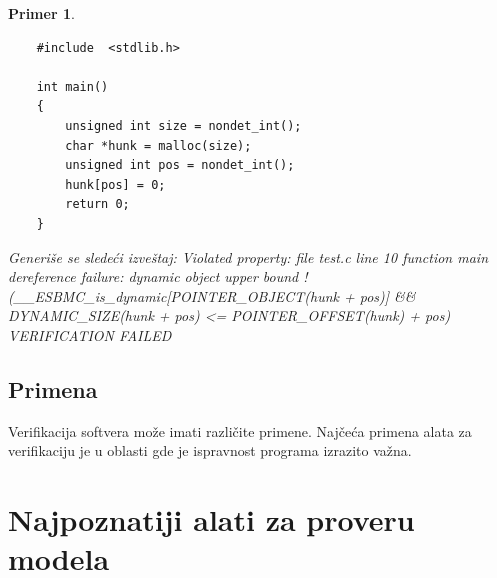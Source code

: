 \documentclass[a4paper]{article}
\newtheorem{primer}{Primer}[section]
\begin{document}
{\begin{primer}
\begin{verbatim}
	#include  <stdlib.h>  	
	
	int main()
	{
		unsigned int size = nondet_int();
		char *hunk = malloc(size); 
		unsigned int pos = nondet_int(); 
		hunk[pos] = 0;
		return 0;
	}
\end{verbatim}

	Generiše se sledeći izveštaj:
	\newline
	Violated property: file test.c line 10 function main dereference failure: dynamic object upper bound !(\_\_ESBMC\_is\_dynamic[POINTER\_OBJECT(hunk + pos)] \&\& DYNAMIC\_SIZE(hunk + pos) <= POINTER\_OFFSET(hunk) + pos) VERIFICATION FAILED
	\end{primer}


	\subsection{Primena}
	\label{subsec:Primena}

	Verifikacija softvera može imati različite primene.  Najčeća primena alata za verifikaciju je u oblasti  gde je ispravnost programa izrazito važna. 


	\section{Najpoznatiji alati za proveru modela}
\label{sec:NazpM}

}
\end{document}

